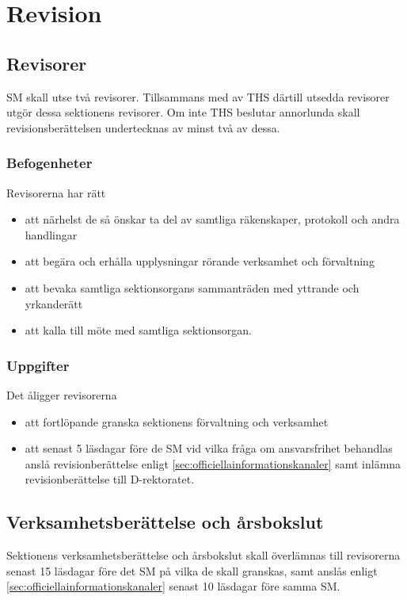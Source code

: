 \documentclass[a4paper,12pt]{article}
\begin{document}
\section{Revision}

\subsection{Revisorer}
\label{sec:revisorer}

SM skall utse två revisorer. Tillsammans med av THS därtill utsedda revisorer utgör dessa sektionens revisorer. Om inte THS beslutar annorlunda skall revisionsberättelsen undertecknas av minst två av dessa.

\subsubsection{Befogenheter}

Revisorerna har rätt

\begin{itemize}
  \item att närhelst de så önskar ta del av samtliga räkenskaper, protokoll och andra handlingar
  \item att begära och erhålla upplysningar rörande verksamhet och förvaltning
  \item att bevaka samtliga sektionsorgans sammanträden med yttrande och yrkanderätt
  \item att kalla till möte med samtliga sektionsorgan.
\end{itemize}

\subsubsection{Uppgifter}

Det åligger revisorerna

\begin{itemize}
  \item att fortlöpande granska sektionens förvaltning och verksamhet
  \item att senast 5 läsdagar före de SM vid vilka fråga om ansvarsfrihet behandlas anslå revisionberättelse enligt \ref{sec:officiellainformationskanaler} samt inlämna revisionberättelse till D-rektoratet.
\end{itemize}

\subsection{Verksamhetsberättelse och årsbokslut}

Sektionens verksamhetsberättelse och årsbokslut skall överlämnas till revisorerna senast 15 läsdagar före det SM på vilka de skall granskas, samt anslås enligt \ref{sec:officiellainformationskanaler} senast 10 läsdagar före samma SM.
\end{document}
